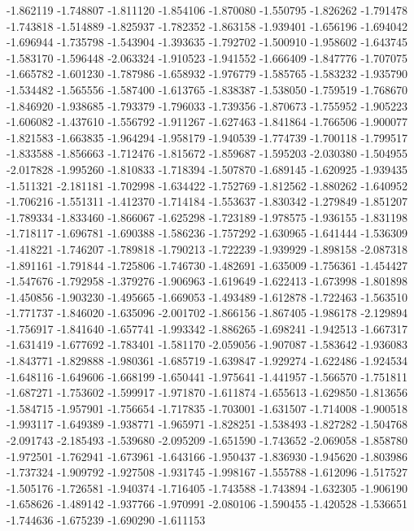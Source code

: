 -1.862119
-1.748807
-1.811120
-1.854106
-1.870080
-1.550795
-1.826262
-1.791478
-1.743818
-1.514889
-1.825937
-1.782352
-1.863158
-1.939401
-1.656196
-1.694042
-1.696944
-1.735798
-1.543904
-1.393635
-1.792702
-1.500910
-1.958602
-1.643745
-1.583170
-1.596448
-2.063324
-1.910523
-1.941552
-1.666409
-1.847776
-1.707075
-1.665782
-1.601230
-1.787986
-1.658932
-1.976779
-1.585765
-1.583232
-1.935790
-1.534482
-1.565556
-1.587400
-1.613765
-1.838387
-1.538050
-1.759519
-1.768670
-1.846920
-1.938685
-1.793379
-1.796033
-1.739356
-1.870673
-1.755952
-1.905223
-1.606082
-1.437610
-1.556792
-1.911267
-1.627463
-1.841864
-1.766506
-1.900077
-1.821583
-1.663835
-1.964294
-1.958179
-1.940539
-1.774739
-1.700118
-1.799517
-1.833588
-1.856663
-1.712476
-1.815672
-1.859687
-1.595203
-2.030380
-1.504955
-2.017828
-1.995260
-1.810833
-1.718394
-1.507870
-1.689145
-1.620925
-1.939435
-1.511321
-2.181181
-1.702998
-1.634422
-1.752769
-1.812562
-1.880262
-1.640952
-1.706216
-1.551311
-1.412370
-1.714184
-1.553637
-1.830342
-1.279849
-1.851207
-1.789334
-1.833460
-1.866067
-1.625298
-1.723189
-1.978575
-1.936155
-1.831198
-1.718117
-1.696781
-1.690388
-1.586236
-1.757292
-1.630965
-1.641444
-1.536309
-1.418221
-1.746207
-1.789818
-1.790213
-1.722239
-1.939929
-1.898158
-2.087318
-1.891161
-1.791844
-1.725806
-1.746730
-1.482691
-1.635009
-1.756361
-1.454427
-1.547676
-1.792958
-1.379276
-1.906963
-1.619649
-1.622413
-1.673998
-1.801898
-1.450856
-1.903230
-1.495665
-1.669053
-1.493489
-1.612878
-1.722463
-1.563510
-1.771737
-1.846020
-1.635096
-2.001702
-1.866156
-1.867405
-1.986178
-2.129894
-1.756917
-1.841640
-1.657741
-1.993342
-1.886265
-1.698241
-1.942513
-1.667317
-1.631419
-1.677692
-1.783401
-1.581170
-2.059056
-1.907087
-1.583642
-1.936083
-1.843771
-1.829888
-1.980361
-1.685719
-1.639847
-1.929274
-1.622486
-1.924534
-1.648116
-1.649606
-1.668199
-1.650441
-1.975641
-1.441957
-1.566570
-1.751811
-1.687271
-1.753602
-1.599917
-1.971870
-1.611874
-1.655613
-1.629850
-1.813656
-1.584715
-1.957901
-1.756654
-1.717835
-1.703001
-1.631507
-1.714008
-1.900518
-1.993117
-1.649389
-1.938771
-1.965971
-1.828251
-1.538493
-1.827282
-1.504768
-2.091743
-2.185493
-1.539680
-2.095209
-1.651590
-1.743652
-2.069058
-1.858780
-1.972501
-1.762941
-1.673961
-1.643166
-1.950437
-1.836930
-1.945620
-1.803986
-1.737324
-1.909792
-1.927508
-1.931745
-1.998167
-1.555788
-1.612096
-1.517527
-1.505176
-1.726581
-1.940374
-1.716405
-1.743588
-1.743894
-1.632305
-1.906190
-1.658626
-1.489142
-1.937766
-1.970991
-2.080106
-1.590455
-1.420528
-1.536651
-1.744636
-1.675239
-1.690290
-1.611153
